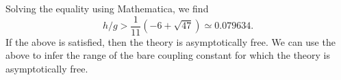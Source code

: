 \begin{enumerate}[label=\alph*)]
\begin{solution}
        Solving the equality using Mathematica, we find
        \begin{equation}
            h/g > \frac{1}{11}(-6+\sqrt{47}) \simeq 0.079634.
        \end{equation}
        If the above is satisfied, then the theory is asymptotically free. We can use the above to infer the range of the bare coupling constant for which the theory is asymptotically free.
    \end{solution}
\end{enumerate}